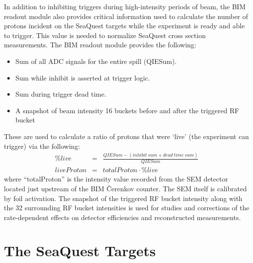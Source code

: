 In addition to inhibiting triggers during high-intensity periods of beam, the BIM readout module also provides critical information used to calculate the number of protons incident on the SeaQuest targets while the experiment is ready and able to trigger. This value is needed to normalize SeaQuest cross section measurements. The BIM readout module provides the following:
\begin{itemize}
	\item Sum of all ADC signals for the entire spill (QIESum).
	\item Sum while inhibit is asserted at trigger logic.
	\item Sum during trigger dead time.
	\item A snapshot of beam intensity 16 buckets before and after the triggered RF bucket
\end{itemize}

These are used to calculate a ratio of protons that were `live' (the experiment can trigger) via the following:
\begin{eqnarray}
\%live & = & \frac{QIESum - (inhibit\ sum + dead\ time\ sum)}{QIESum} \\
liveProton & = & totalProton \cdot \%live
\label{eqn:liveproton}
\end{eqnarray}
where ``totalProton'' is the intensity value recorded from the SEM detector located just upstream of the BIM \v{C}erenkov counter. The SEM itself is calibrated by foil activation. The snapshot of the triggered RF bucket intensity along with the 32 surrounding RF bucket intensities is used for studies and corrections of the rate-dependent effects on detector efficiencies and reconstructed measurements.

\section{The SeaQuest Targets}

